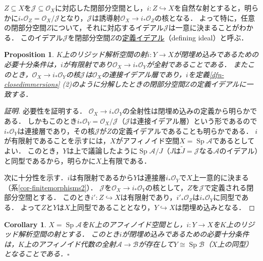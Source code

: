 \documentclass[a4paper,12pt, dvipdfmx]{jsbook}
\def\O{\mathscr{O}}
\def\til#1{\widetilde{#1}}%
\def\Sp{\mathop{\mathrm{Sp}}\nolimits}
\theoremstyle{plain}
\newtheorem{prop}[thm]{\bfseries Proposition}
\newtheorem{cor}[thm]{\bfseries Corollary}
\theoremstyle{definition}
\begin{document}
$Z\subseteq X$を$\mathscr{J}\subseteq\O_X$に対応した閉部分空間とし，$i\colon Z\hookrightarrow X$を自然な射とすると，明らかに$i_{\ast}\O_Z=\O_X/\mathscr{J}$となり，$\mathscr{J}$は誘導射$\O_X\rightarrow i_{\ast}\O_Z$の核となる．
よって特に，任意の閉部分空間$Z$について，それに対応するイデアル$\mathscr{J}$は一意に決まることがわかる．
このイデアル$\mathscr{J}$を閉部分空間$Z$の\underline{定義イデアル}（defining ideal）と呼ぶ．

\begin{prop}\label{prop-closedimmersion2}{\rm 
$K$上のリジッド解析空間の射$i\colon Y\rightarrow X$が閉埋め込みであるための必要十分条件は，$i$が有限射であり$\O_X\rightarrow i_{\ast}\O_Y$が全射であることである．
またこのとき，$\O_X\rightarrow i_{\ast}\O_Y$の核$\mathscr{J}$は$\O_X$の連接イデアル層であり，$i$を定義\ref{dfn-closedimmersions} (2)のように分解したときの閉部分空間$Z$の定義イデアルに一致する．}
\end{prop}

\begin{proof}[証明]
必要性を証明する．
$\O_X\rightarrow i_{\ast}\O_Y$の全射性は閉埋め込みの定義から明らかである．
しかもこのとき$i_{\ast}\O_Y=\O_X/\mathscr{J}$（$\mathscr{J}$は連接イデアル層）という形であるので$i_{\ast}\O_Y$は連接層であり，その核$\mathscr{J}$が$Z$の定義イデアルであることも明らかである．
$i$が有限射であることを示すには，$X$がアフィノイド空間$X=\Sp\mathcal{A}$であるとしてよい．
このとき，$Y$は上で議論したように$\Sp\mathcal{A}/J$（$J$は$\til{J}=\mathscr{J}$なる$\mathcal{A}$のイデアル）と同型であるから，明らかに$X$上有限である．

次に十分性を示す．$i$は有限射であるから$Y$は連接層$i_{\ast}\O_Y$で$X$上一意的に決まる（系\ref{cor-finitemorphisms2}）．
$\mathscr{J}$を$\O_X\rightarrow i_{\ast}\O_Y$の核として，$Z$を$\mathscr{J}$で定義される閉部分空間とする．
このとき$i'\colon Z\hookrightarrow X$は有限射であり，$i'_{\ast}\O_Z$は$i_{\ast}\O_Y$に同型である．
よって$Z$と$Y$は$X$上同型であることとなり，$Y\hookrightarrow X$は閉埋め込みとなる．
\end{proof}

\begin{cor}\label{cor-closedimmesion2}{\rm 
$X=\Sp\mathcal{A}$を$K$上のアフィノイド空間とし，$i\colon Y\rightarrow X$を$K$上のリジッド解析空間の射とする．
このとき$i$が閉埋め込みであるための必要十分条件は，$K$上のアフィノイド代数の全射$\mathcal{A}\rightarrow\mathcal{B}$が存在して$Y\cong\Sp\mathcal{B}$（$X$上の同型）となることである．}\hfill$\square$
\end{cor}
\end{document}
